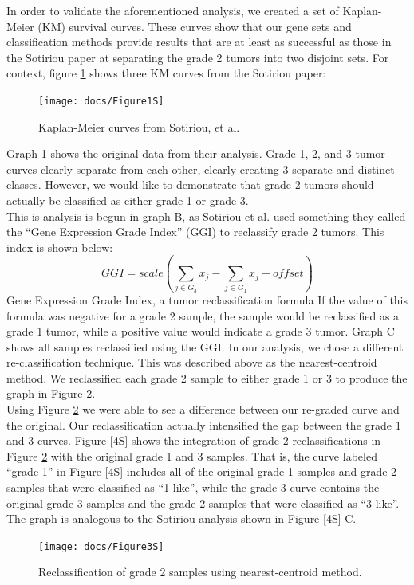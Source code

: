 \documentclass[a4paper,10pt]{article}
\begin{document}
In order to validate the aforementioned analysis, we created a set of Kaplan-Meier 
(KM) survival curves. These curves show that our gene sets and classification 
methods provide results that are at least as successful as those in the Sotiriou 
paper at separating the grade 2 tumors into two disjoint sets. 
For context, figure \ref{1S} shows three KM curves from the Sotiriou paper:
\begin{figure}
\centering
\texttt{[image: docs/Figure1S]}
\caption{Kaplan-Meier curves from Sotiriou, et al.}\label{1S}
\end{figure}
Graph \ref{1S} shows the original data from their analysis. Grade 1, 2, and 3 tumor 
curves clearly separate from each other, clearly creating 3 separate and distinct 
classes. However, we would like to demonstrate that grade 2 tumors should 
actually be classified as either grade 1 or grade 3. \\

This is analysis is begun in graph B, as Sotiriou et al. used something 
they called the “Gene Expression Grade Index” (GGI) to reclassify 
grade 2 tumors. This index is shown below:
$$
GGI = scale\left( \sum_{j\in G_3}{ x_j } - \sum_{j\in G_1}{ x_j } - offset  \right)
$$
Gene Expression Grade Index, a tumor reclassification formula
If the value of this formula was negative for a grade 2 sample, 
the sample would be reclassified as a grade 1 tumor, while a positive 
value would indicate a grade 3 tumor. Graph C shows all samples reclassified using the GGI.
In our analysis, we chose a different re-classification technique. 
This was described above as the nearest-centroid method. We reclassified 
each grade 2 sample to either grade 1 or 3 to produce the graph in Figure \ref{3S}.\\



Using Figure \ref{3S} we were able to see a difference between our re-graded curve 
and the original. Our reclassification actually intensified the gap between the grade 1 and 3 curves.
Figure \ref{4S} shows the integration of grade 2 reclassifications in Figure  \ref{3S} with 
the original grade 1 and 3 samples. That is, the curve labeled “grade 1” in 
Figure  \ref{4S} includes all of the original grade 1 samples and grade 2 samples 
that were classified as “1-like”, while the grade 3 curve contains the original
 grade 3 samples and the grade 2 samples that were classified as “3-like”. 
The graph is analogous to the Sotiriou analysis shown in Figure \ref{4S}-C.
\begin{figure}
\centering
\texttt{[image: docs/Figure3S]}
\caption{Reclassification of grade 2 samples using nearest-centroid method.}\label{3S}
\end{figure}
\end{document}
